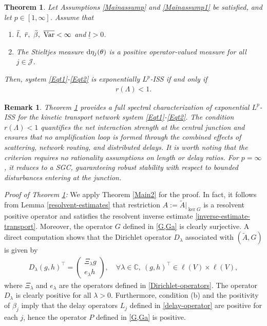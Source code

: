 \documentclass[onecolumn]{autart}
\def\C{\mathbb C}
\newtheorem{theorem}{Theorem}[section]  %
\newtheorem{remark}{Remark}[section]
\numberwithin{equation}{section}
\begin{document}
	\begin{theorem}\label{Result1}
		Let Assumptions \ref{Mainassump} and \ref{Mainassump1} be satisfied, and let $p\in [1,\infty]$. Assume that
		\begin{enumerate}
			\item[(a)]  $\bar{l},\ \bar{r},\ \bar{\beta},\ \overline{{\rm Var}}<\infty$ and  $\underline{l} >0$.
			\item[(b)] The Stieltjes measure ${\rm d}\eta_j(\theta)$ is a positive operator-valued measure for all $j\in \mathcal{J}$.
		\end{enumerate}
		Then, system \eqref{Eqt1}-\eqref{Eqt2} is exponentially $L^p$-ISS if and only if
		\begin{align}\label{Cond-ISS}
			r(\Lambda) < 1.
		\end{align}
	\end{theorem}
\begin{remark}
		Theorem  \ref{Result1} provides a full spectral characterization of exponential $L^p$-ISS for the kinetic transport network system \eqref{Eqt1}-\eqref{Eqt2}.   The condition $r(\Lambda)<1$ quantifies the net interaction strength at the central junction and ensures that no amplification loop is formed through the combined effects of scattering, network routing, and distributed delays. It is worth noting that the criterion requires no rationality assumptions on length or delay ratios. For $p = \infty$, it reduces to a SGC, guaranteeing robust stability with respect to bounded disturbances entering at the junction.
	\end{remark}
	 \emph{Proof of Theorem  \ref{Result1}:\enspace}
		We apply Theorem \ref{Main2} for the proof. In fact, it follows from Lemma \ref{resolvent-estimates} that restriction $A := \tilde{A}\vert_{\ker G}$ is a resolvent positive operator and satisfies the resolvent inverse estimate \eqref{inverse-estimate-transport}. Moreover, the operator $G$ defined in \eqref{G,Ga} is clearly surjective. A direct computation shows that the Dirichlet operator $D_\lambda$ associated with $(\tilde{A}, G)$ is given by
		\begin{align*}%
			D_\lambda(g,h)^{\top} = \begin{pmatrix}
				\Xi_\lambda g \\
				e_\lambda h
			\end{pmatrix},\quad \forall \lambda \in \C,\ (g,h)^{\top} \in \bm{\ell}(V)\times \bm{\ell}(V),
		\end{align*}
		where $\Xi_\lambda$ and $e_\lambda$ are the operators defined in \eqref{Dirichlet-operators}. The operator $D_\lambda$ is clearly positive for all $\lambda > 0$. Furthermore, condition (b) and the positivity of $\beta_j$ imply that the delay operators $L_j$ defined in \eqref{delay-operator} are positive for each $j$, hence the operator $P$ defined in \eqref{G,Ga} is positive.
		
\end{document}
